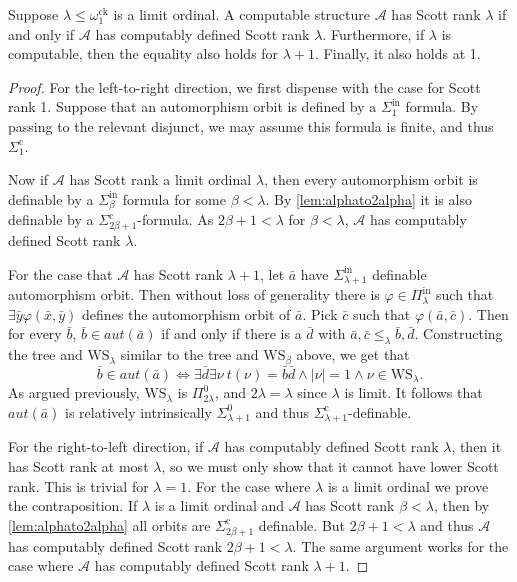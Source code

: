 \documentclass{amsart}
\newcommand\+[1]{\mathcal{#1}}
\renewcommand\*[1]{\mathbf{#1}}
\renewcommand\=[1]{\text{#1}}
\renewcommand\*[1]{\mathbf{#1}}
\renewcommand{\phi}{\varphi}
\newcommand{\Pinf}[1]{\Pi^{\mathrm{in}}_{#1}}
\newcommand{\Sinf}[1]{\Sigma^{\mathrm{in}}_{#1}}
\newcommand{\Sicom}[1]{\Sigma^{\mathrm{c}}_{#1}}
\newcommand{\ock}{\omega_{1}^{\mathrm{ck}}}
\begin{document}
\begin{theorem}\label{thm:limitiffcompdefined}
  Suppose $\lambda\leq \ock$ is a limit ordinal. A computable structure $\+A$ has Scott rank $\lambda$ if and only if $\+A$ has computably defined Scott rank $\lambda$. Furthermore, if $\lambda$ is computable, then the equality also holds for $\lambda+1$.  Finally, it also holds at 1.
\end{theorem}
\begin{proof}
For the left-to-right direction, we first dispense with the case for Scott rank 1.  Suppose that an automorphism orbit is defined by a $\Sinf{1}$ formula.  By passing to the relevant disjunct, we may assume this formula is finite, and thus $\Sicom{1}$.

Now if $\+A$ has Scott rank a limit ordinal $\lambda$, then every automorphism orbit is definable by a $\Sinf{\beta}$ formula for some $\beta<\lambda$. By \cref{lem:alphato2alpha} it is also definable by a $\Sicom{2\beta+1}$-formula. As $2\beta+1<\lambda$ for $\beta<\lambda$, $\+A$ has computably defined Scott rank $\lambda$.

For the case that $\+A$ has Scott rank $\lambda+1$, let $\bar a$ have $\Sinf{\lambda+1}$ definable automorphism orbit. Then without loss of generality there is $\phi\in \Pinf{\lambda}$ such that $\exists \bar y \phi(\bar x,\bar y)$ defines the automorphism orbit of $\bar a$. Pick $\bar c$ such that $\phi(\bar a,\bar c)$. Then for every $\bar b$, $\bar b\in aut(\bar a)$ if and only if there is a $\bar d$ with $\bar a,\bar c\leq_{\lambda}\bar b,\bar d$. Constructing the tree and $\mathrm{WS}_\lambda$ similar to the tree and $\mathrm{WS}_\beta$ above, we get that 
  \[ \bar b\in aut(\bar a) \iff \exists \bar d\exists \nu \ t(\nu)=\bar b\bar d \land |\nu|=1 \land \nu \in \mathrm{WS}_{\lambda}.\] 
  As argued previously, $\mathrm{WS}_\lambda$ is $\Pi^0_{2\lambda}$, and $2\lambda = \lambda$ since $\lambda$ is limit. It follows that $aut(\bar a)$ is relatively intrinsically $\Sigma^0_{\lambda+1}$ and thus $\Sicom{\lambda+1}$-definable.

  For the right-to-left direction, if $\+A$ has computably defined Scott rank $\lambda$, then it has Scott rank at most $\lambda$, so we must only show that it cannot have lower Scott rank. This is trivial for $\lambda=1$.
  For the case where $\lambda$ is a limit ordinal we prove the contraposition. If $\lambda$ is a limit ordinal and $\+A$ has Scott rank $\beta<\lambda$, then by \cref{lem:alphato2alpha} all orbits are $\Sicom{2\beta+1}$ definable. But $2\beta+1<\lambda$ and thus $\+A$ has computably defined Scott rank $2\beta+1<\lambda$. The same argument works for the case where $\+A$ has computably defined Scott rank $\lambda+1$.
\end{proof}
\end{document}
